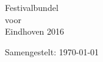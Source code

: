 \documentclass[10pt,a4paper,twoside]{article}
\begin{document}
\begin{center}
\Huge{Festivalbundel\\voor\\Eindhoven 2016}
\end{center}
\vspace*{\fill}
\tableofcontents
\vspace{1em}
\hfill\small{Samengestelt: \today}







\end{document}
